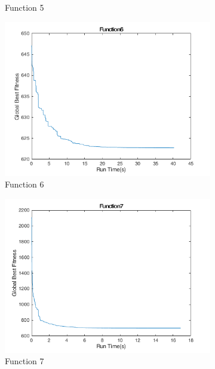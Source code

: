 \begin{figure}
\begin{subfigure}[b]{0.4\textwidth}
    \caption{Function 5}
  \end{subfigure}
  \begin{subfigure}[b]{0.4\textwidth}
    \includegraphics[width=\textwidth]{img/cecrt/f6}
    \caption{Function 6}
  \end{subfigure}
  \begin{subfigure}[b]{0.4\textwidth}
    \includegraphics[width=\textwidth]{img/cecrt/f7}
    \caption{Function 7}
  \end{subfigure}
  \begin{subfigure}[b]{0.4\textwidth}

\end{subfigure}
\end{figure}
